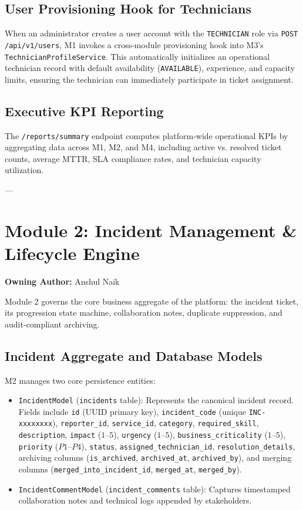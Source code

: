 \documentclass[11pt,a4paper,oneside]{report}
\begin{document}
\subsection{User Provisioning Hook for Technicians}
When an administrator creates a user account with the \texttt{TECHNICIAN} role via \texttt{POST /api/v1/users}, M1 invokes a cross-module provisioning hook into M3's \texttt{TechnicianProfileService}. This automatically initializes an operational technician record with default availability (\texttt{AVAILABLE}), experience, and capacity limits, ensuring the technician can immediately participate in ticket assignment.

\subsection{Executive KPI Reporting}
The \texttt{/reports/summary} endpoint computes platform-wide operational KPIs by aggregating data across M1, M2, and M4, including active vs. resolved ticket counts, average MTTR, SLA compliance rates, and technician capacity utilization.

---

\section{Module 2: Incident Management \& Lifecycle Engine}
\label{sec:module_m2}
\textbf{Owning Author:} Anshul Naik

Module 2 governs the core business aggregate of the platform: the incident ticket, its progression state machine, collaboration notes, duplicate suppression, and audit-compliant archiving.

\subsection{Incident Aggregate and Database Models}
M2 manages two core persistence entities:
\begin{itemize}
    \item \texttt{IncidentModel} (\texttt{incidents} table): Represents the canonical incident record. Fields include \texttt{id} (UUID primary key), \texttt{incident\_code} (unique \texttt{INC-xxxxxxxx}), \texttt{reporter\_id}, \texttt{service\_id}, \texttt{category}, \texttt{required\_skill}, \texttt{description}, \texttt{impact} ($1$--$5$), \texttt{urgency} ($1$--$5$), \texttt{business\_criticality} ($1$--$5$), \texttt{priority} ($P1$--$P4$), \texttt{status}, \texttt{assigned\_technician\_id}, \texttt{resolution\_details}, archiving columns (\texttt{is\_archived}, \texttt{archived\_at}, \texttt{archived\_by}), and merging columns (\texttt{merged\_into\_incident\_id}, \texttt{merged\_at}, \texttt{merged\_by}).
    \item \texttt{IncidentCommentModel} (\texttt{incident\_comments} table): Captures timestamped collaboration notes and technical logs appended by stakeholders.
\end{itemize}
\end{document}
